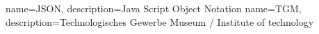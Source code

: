 \makeglossaries
{} {name=JSON, description={Java Script Object Notation}}
 {name=TGM, description={Technologisches Gewerbe Museum / Institute of technology}}

\renewcommand*\glspostdescription{\dotfill}

